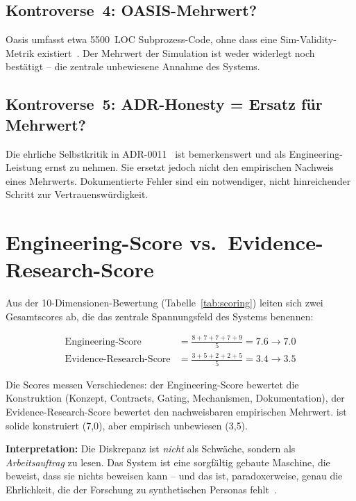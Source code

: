 \subsection{Kontroverse~4: OASIS-Mehrwert?}\label{sec:k4}

Oasis umfasst etwa 5500~LOC Subprozess-Code, ohne dass eine Sim-Validity-Metrik existiert~\cite{mast2025,hiddenbench2025}. Der Mehrwert der Simulation ist weder widerlegt noch best{\"a}tigt -- die zentrale unbewiesene Annahme des Systems.

\subsection{Kontroverse~5: ADR-Honesty = Ersatz f{\"u}r Mehrwert?}\label{sec:k5}

Die ehrliche Selbstkritik in ADR-0011~\cite{adr-0011} ist bemerkenswert und als Engineering-Leistung ernst zu nehmen. Sie ersetzt jedoch nicht den empirischen Nachweis eines Mehrwerts. Dokumentierte Fehler sind ein notwendiger, nicht hinreichender Schritt zur Vertrauensw{\"u}rdigkeit.

\section{Engineering-Score vs.\ Evidence-Research-Score}\label{sec:scores}

Aus der 10-Dimensionen-Bewertung (Tabelle~\ref{tab:scoring}) leiten sich zwei Gesamtscores ab, die das zentrale Spannungsfeld des Systems benennen:

\begin{align*}
  \mathrm{Engineering\text{-}Score} &= \frac{8 + 7 + 7 + 7 + 9}{5} = 7.6 \to 7.0 \\
  \mathrm{Evidence\text{-}Research\text{-}Score} &= \frac{3 + 5 + 2 + 2 + 5}{5} = 3.4 \to 3.5
\end{align*}

Die Scores messen Verschiedenes: der Engineering-Score bewertet die Konstruktion (Konzept, Contracts, Gating, Mechanismen, Dokumentation), der Evidence-Research-Score bewertet den nachweisbaren empirischen Mehrwert. \agora{} ist solide konstruiert (7{,}0), aber empirisch unbewiesen (3{,}5).

\textbf{Interpretation:} Die Diskrepanz ist \emph{nicht} als Schw{\"a}che, sondern als \emph{Arbeitsauftrag} zu lesen. Das System ist eine sorgf{\"a}ltig gebaute Maschine, die beweist, dass sie nichts beweisen kann -- und das ist, paradoxerweise, genau die Ehrlichkeit, die der Forschung zu synthetischen Personas fehlt~\cite{citednotverified,analyticflexibility}.

